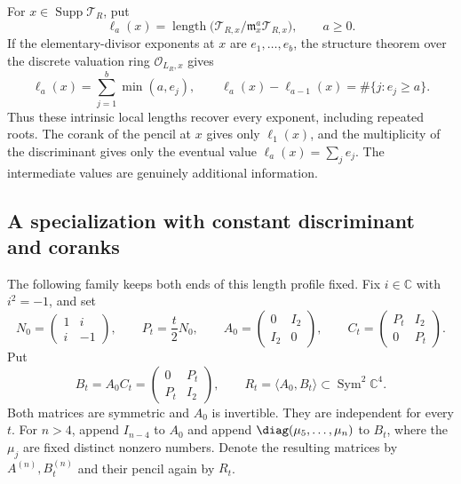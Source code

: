 \documentclass[11pt,reqno]{amsart}
\numberwithin{equation}{section}
\theoremstyle{definition}\newtheorem{definition}[theorem]{Definition}
\theoremstyle{remark}\newtheorem{remark}[theorem]{Remark}
\newcommand{\C}{\mathbb C}\newcommand{\Q}{\mathbb Q}
\newcommand{\OO}{\mathcal O}\newcommand{\II}{\mathcal I}
\DeclareMathOperator{\Sym}{Sym}\DeclareMathOperator{\Gr}{Gr}
\DeclareMathOperator{\Supp}{Supp}\DeclareMathOperator{\Hilb}{Hilb}
\DeclareMathOperator{\length}{length}
\begin{document}
For \(x\in\Supp\mathcal T_R\), put
\begin{equation}\label{eq:spectral-length-profile}
 \ell_a(x)=\length\bigl(\mathcal T_{R,x}/
                  \mathfrak m_x^a\mathcal T_{R,x}\bigr),
 \qquad a\ge0.
\end{equation}
If the elementary-divisor exponents at \(x\) are
\(e_1,\ldots,e_b\), the structure theorem over the discrete
valuation ring \(\OO_{L_R,x}\) gives
\begin{equation}\label{eq:spectral-partition-inversion}
 \ell_a(x)=\sum_{j=1}^b\min(a,e_j),\qquad
 \ell_a(x)-\ell_{a-1}(x)=\#\{j:e_j\ge a\}.
\end{equation}
Thus these intrinsic local lengths recover every exponent, including
repeated roots.  The corank of the pencil at \(x\) gives only
\(\ell_1(x)\), and the multiplicity of the discriminant gives
only the eventual value \(\ell_a(x)=\sum_j e_j\).  The
intermediate values are genuinely additional information.

\subsection{A specialization with constant discriminant and coranks}

The following family keeps both ends of this length profile fixed.
Fix \(i\in\C\) with \(i^2=-1\), and set
\begin{equation}\label{eq:rank-preserving-four-block}
 N_0=\begin{pmatrix}1&i\\i&-1\end{pmatrix},\qquad
 P_t=\frac t2N_0,\qquad
 A_0=\begin{pmatrix}0&I_2\\I_2&0\end{pmatrix},\qquad
 C_t=\begin{pmatrix}P_t&I_2\\0&P_t\end{pmatrix}.
\end{equation}
Put
\begin{equation}\label{eq:symmetric-specialization-pair}
 B_t=A_0C_t=\begin{pmatrix}0&P_t\\P_t&I_2\end{pmatrix},
 \qquad R_t=\langle A_0,B_t\rangle\subset\Sym^2\C^4.
\end{equation}
Both matrices are symmetric and \(A_0\) is invertible.  They
are independent for every \(t\).  For \(n>4\), append
\(I_{n-4}\) to \(A_0\) and append
\(\diag(\mu_5,\ldots,\mu_n)\) to \(B_t\), where the
\(\mu_j\) are fixed distinct nonzero numbers.  Denote the resulting
matrices by \(A^{(n)},B_t^{(n)}\) and their pencil again by \(R_t\).
\end{document}

